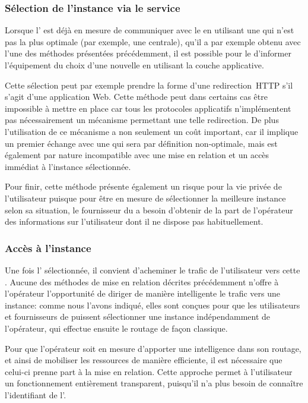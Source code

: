 \documentclass[../main.tex]{subfiles}
\begin{document}
\pagebreak
\subsubsection{Sélection de l’instance via le service}
Lorsque l’ est déjà en mesure de communiquer avec le  en utilisant une  qui n’est pas la plus optimale (par exemple, une  centrale), qu’il a par exemple obtenu avec l’une des méthodes présentées précédemment, il est possible pour le  d’informer l’équipement du choix d’une nouvelle  en utilisant la couche applicative.

Cette sélection peut par exemple prendre la forme d’une redirection~HTTP s’il s’agit d’une application Web.
Cette méthode peut dans certains cas être impossible à mettre en place car tous les protocoles applicatifs n’implémentent pas nécessairement un mécanisme permettant une telle redirection.
De plus l’utilisation de ce mécanisme a non seulement un coût important, car il implique un premier échange avec une  qui sera par définition non-optimale, mais est également par nature incompatible avec une mise en relation et un accès immédiat à l’instance sélectionnée.

Pour finir, cette méthode présente également un risque pour la vie privée de l’utilisateur puisque pour être en mesure de sélectionner la meilleure instance selon sa situation, le fournisseur du  a besoin d’obtenir de la part de l’opérateur des informations sur l’utilisateur dont il ne dispose pas habituellement.

\subsubsection{Accès à l’instance}
Une fois l’ sélectionnée, il convient d’acheminer le trafic de l’utilisateur vers cette .
Aucune des méthodes de mise en relation décrites précédemment n’offre à l’opérateur l’opportunité de diriger de manière intelligente le trafic vers une instance: comme nous l’avons indiqué, elles sont conçues pour que les utilisateurs et fournisseurs de  puissent sélectionner une instance indépendamment de l’opérateur, qui effectue ensuite le routage de façon classique.

Pour que l’opérateur soit en mesure d’apporter une intelligence dans son routage, et ainsi de mobiliser les ressources de manière efficiente, il est nécessaire que celui-ci prenne part à la mise en relation. 
Cette approche permet à l’utilisateur un fonctionnement entièrement transparent, puisqu’il n’a plus besoin de connaître l’identifiant de l’.
\end{document}
